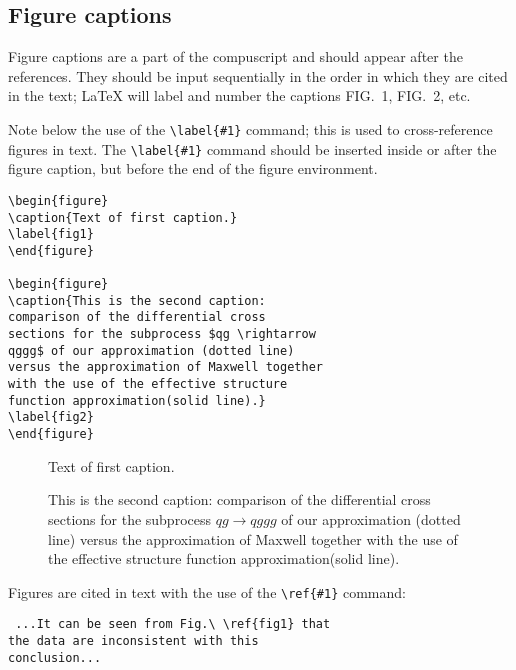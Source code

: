 \subsection{Figure captions}

Figure captions are a part of the compuscript and should appear after the
references. They should be input sequentially in the order in which they
are cited in the text; \LaTeX{}  will label and number the captions FIG.~1,
FIG.~2, etc.

Note below the use of the \verb+\label{#1}+ command; this is used to
cross-reference figures in text. The \verb+\label{#1}+ command should be
inserted inside or after the figure caption, but before the end of the
figure environment.

\smallskip

\begin{verbatim}
\begin{figure}
\caption{Text of first caption.}
\label{fig1}
\end{figure}

\begin{figure}
\caption{This is the second caption:
comparison of the differential cross
sections for the subprocess $qg \rightarrow
qggg$ of our approximation (dotted line)
versus the approximation of Maxwell together
with the use of the effective structure
function approximation(solid line).}
\label{fig2}
\end{figure}

\end{verbatim}


\begin{figure}
\caption{Text of first caption.}
\label{fig1}
\end{figure}

\begin{figure}
\caption{This is the second caption:
comparison of the differential cross sections
for the subprocess $qg \rightarrow qggg$ of our
approximation (dotted line) versus the
approximation of Maxwell together with the use
of the effective structure function
approximation(solid line).}
\label{fig2}
\end{figure}


\bigskip

Figures are cited in text with the use of  the \verb+\ref{#1}+ command:

\smallskip

\begin{verbatim}
 ...It can be seen from Fig.\ \ref{fig1} that
the data are inconsistent with this
conclusion...
\end{verbatim}

